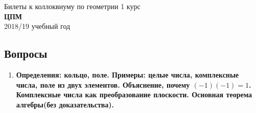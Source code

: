 \documentclass[12pt, oneside]{book}
\theoremstyle{definition}
\begin{document}
\begin{center}
{\Large Билеты к коллоквиуму по геометрии 1 курс}\\
\textbf{ЦПМ}\\
2018/19 учебный год %
\end{center}


\subsection*{Вопросы}


\begin{enumerate}



\item \textbf{Определения: кольцо, поле. Примеры: целые числа, комплексные числа, поле из двух элементов. Объяснение, почему $(-1)(-1)=1$. Комплексные числа как преобразование плоскости. Основная теорема алгебры(без доказательства).}\\


\end{enumerate}
\end{document}
